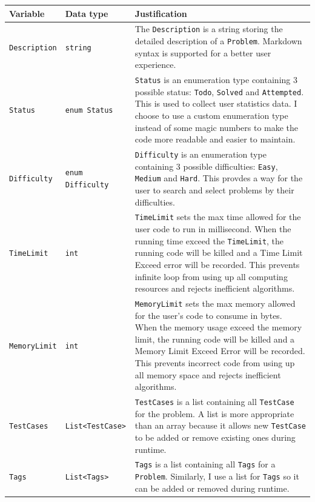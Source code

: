 \documentclass[a4paper]{report}
\begin{document}
\begin{tabulary}{\textwidth}{|l|l|L|}
    \hline
    Variable & Data type & Justification \\
    \hline
    \texttt{Description} & \texttt{string} & The \texttt{Description} is a string storing the detailed description of a \texttt{Problem}. Markdown syntax is supported for a better user experience. \\
    \hline
    \texttt{Status} & \texttt{enum Status} & \texttt{Status} is an enumeration type containing 3 possible status: \texttt{Todo}, \texttt{Solved} and \texttt{Attempted}. This is used to collect user statistics data. I choose to use a custom enumeration type instead of some magic numbers to make the code more readable and easier to maintain. \\
    \hline
    \texttt{Difficulty} & \texttt{enum Difficulty} & \texttt{Difficulty} is an enumeration type containing 3 possible difficulties: \texttt{Easy}, \texttt{Medium} and \texttt{Hard}. This provdes a way for the user to search and select problems by their difficulties. \\
    \hline
    \texttt{TimeLimit} & \texttt{int} & \texttt{TimeLimit} sets the max time allowed for the user code to run in millisecond. When the running time exceed the \texttt{TimeLimit}, the running code will be killed and a Time Limit Exceed error will be recorded. This prevents infinite loop from using up all computing resources and rejects inefficient algorithms. \\
    \hline
    \texttt{MemoryLimit} & \texttt{int} & \texttt{MemoryLimit} sets the max memory allowed for the user's code to consume in bytes. When the memory usage exceed the memory limit, the running code will be killed and a Memory Limit Exceed Error will be recorded. This prevents incorrect code from using up all memory space and rejects inefficient algorithms. \\
    \hline
    \texttt{TestCases} & \texttt{List<TestCase>} & \texttt{TestCases} is a list containing all \texttt{TestCase} for the problem. A list is more appropriate than an array because it allows new \texttt{TestCase} to be added or remove existing ones during runtime. \\
    \hline
    \texttt{Tags} & \texttt{List<Tags>} & \texttt{Tags} is a list containing all \texttt{Tags} for a \texttt{Problem}. Similarly, I use a list for \texttt{Tags} so it can be added or removed during runtime. \\
    \hline
\end{tabulary}
\end{document}
